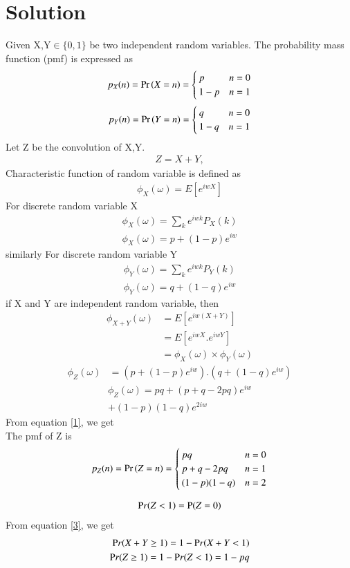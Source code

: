\documentclass[journal,12pt,twocolumn]{IEEEtran}
\begin{document}
\section*{Solution}
Given X,Y$\in \{0,1\}$ be two independent random variables. The probability mass function (pmf) is expressed  as 
\begin{align}
    p_{X}(n) = \Pr\left(X = n\right) = 
\begin{cases}
p & n=0
\\
1-p & n=1
\end{cases}\label{1}
\end{align}
\begin{align}
    p_{Y}(n) = \Pr\left(Y = n\right) = 
\begin{cases}
q & n=0
\\
1-q & n=1
\end{cases}\label{1}
\end{align}
Let Z be the convolution of X,Y.
\begin{align}
  Z=X+Y,
  \end{align}
  Characteristic function of random variable is defined as\\
\begin{align}
\phi_X(\omega)=E[e^{iwX}]
\end{align}
For discrete random variable X
\begin{align}
 \label{1}  \phi_X(\omega) =\sum_{k}e^{iwk}P_X(k)\\
\phi_X(\omega)= p+(1-p)e^{iw}
\end{align}
similarly For discrete random variable Y
\begin{align}
\phi_Y(\omega) = \sum_{k}e^{iwk}P_Y(k)\\
\phi_Y(\omega)= q+(1-q)e^{iw}
\end{align}
if X and Y are independent random variable, then
\begin{align}
\phi_{X+Y}(\omega)&=E[e^{iw(X+Y)}] \\
               &=E[e^{iwX}.e^{iwY}] \\
               &=\phi_X(\omega)\times \phi_Y(\omega)
\end{align}
\begin{align}
  \phi_{Z}(\omega)& =(p+(1-p)e^{iw}).(q+(1-q)e^{iw})
  \end{align}
  \begin{multline}
\phi_{Z}(\omega) = pq+(p+q-2pq)e^{iw}\\
  +(1-p)(1-q)e^{2iw}
\end{multline}
  From equation \eqref{1}, we get\\
    The pmf of Z is 
\begin{align}
    p_{Z}(n) = \Pr\left(Z = n\right) = 
\begin{cases}
pq & n=0
\\
p+q-2pq & n=1\\
(1-p)(1-q) & n=2
\end{cases}\label{2}
\end{align}

\begin{align}
  \mbox Pr(Z<1) = \mbox P(Z=0)  \label{3} 
  \end{align}
  From equation \eqref{3}, we get
\begin{align}
  \mbox Pr(X+Y\geq1) = 1 - \mbox Pr(X+Y<1)\\
  \mbox Pr(Z\geq1)= 1-\mbox Pr(Z<1) = 1-pq   
\end{align}
\end{document}
